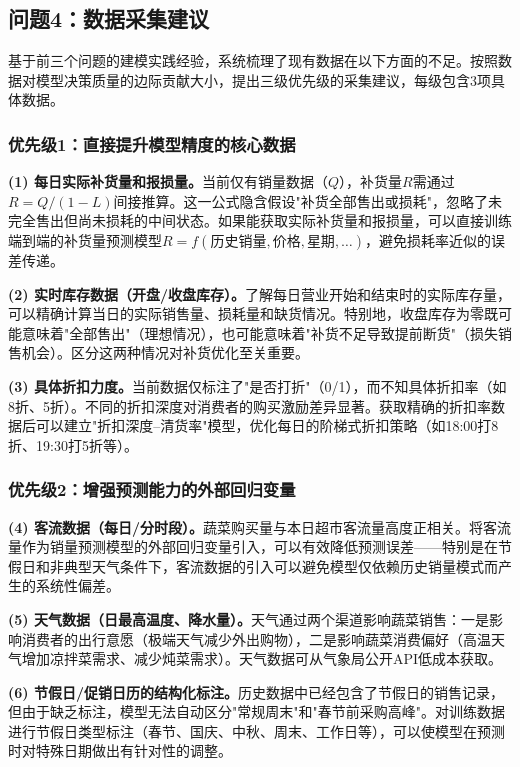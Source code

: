 \documentclass[12pt,a4paper]{ctexart}
\begin{document}
\subsection{问题4：数据采集建议}

基于前三个问题的建模实践经验，系统梳理了现有数据在以下方面的不足。按照数据对模型决策质量的边际贡献大小，提出三级优先级的采集建议，每级包含3项具体数据。

\subsubsection{优先级1：直接提升模型精度的核心数据}

\textbf{(1) 每日实际补货量和报损量。}当前仅有销量数据（$Q$），补货量$R$需通过$R = Q/(1-L)$间接推算。这一公式隐含假设"补货全部售出或损耗"，忽略了未完全售出但尚未损耗的中间状态。如果能获取实际补货量和报损量，可以直接训练端到端的补货量预测模型$R = f(\text{历史销量}, \text{价格}, \text{星期}, \ldots)$，避免损耗率近似的误差传递。

\textbf{(2) 实时库存数据（开盘/收盘库存）。}了解每日营业开始和结束时的实际库存量，可以精确计算当日的实际销售量、损耗量和缺货情况。特别地，收盘库存为零既可能意味着"全部售出"（理想情况），也可能意味着"补货不足导致提前断货"（损失销售机会）。区分这两种情况对补货优化至关重要。

\textbf{(3) 具体折扣力度。}当前数据仅标注了"是否打折"（0/1），而不知具体折扣率（如8折、5折）。不同的折扣深度对消费者的购买激励差异显著。获取精确的折扣率数据后可以建立"折扣深度--清货率"模型，优化每日的阶梯式折扣策略（如18:00打8折、19:30打5折等）。

\subsubsection{优先级2：增强预测能力的外部回归变量}

\textbf{(4) 客流数据（每日/分时段）。}蔬菜购买量与本日超市客流量高度正相关。将客流量作为销量预测模型的外部回归变量引入，可以有效降低预测误差——特别是在节假日和非典型天气条件下，客流数据的引入可以避免模型仅依赖历史销量模式而产生的系统性偏差。

\textbf{(5) 天气数据（日最高温度、降水量）。}天气通过两个渠道影响蔬菜销售：一是影响消费者的出行意愿（极端天气减少外出购物），二是影响蔬菜消费偏好（高温天气增加凉拌菜需求、减少炖菜需求）。天气数据可从气象局公开API低成本获取。

\textbf{(6) 节假日/促销日历的结构化标注。}历史数据中已经包含了节假日的销售记录，但由于缺乏标注，模型无法自动区分"常规周末"和"春节前采购高峰"。对训练数据进行节假日类型标注（春节、国庆、中秋、周末、工作日等），可以使模型在预测时对特殊日期做出有针对性的调整。
\end{document}
